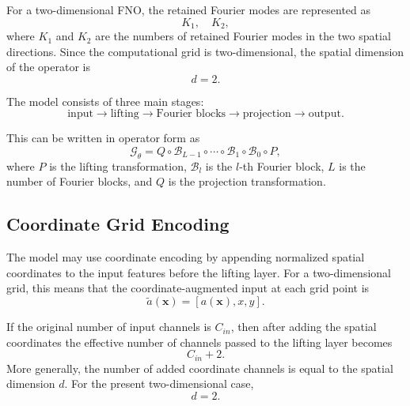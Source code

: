 For a two-dimensional FNO, the retained Fourier modes are represented as
\begin{equation}
K_1, \quad K_2,
\end{equation}
where \(K_1\) and \(K_2\) are the numbers of retained Fourier modes in the two spatial directions. Since the computational grid is two-dimensional, the spatial dimension of the operator is
\begin{equation}
d = 2.
\end{equation}

The model consists of three main stages:
\begin{equation}
\text{input}
\rightarrow
\text{lifting}
\rightarrow
\text{Fourier blocks}
\rightarrow
\text{projection}
\rightarrow
\text{output}.
\end{equation}

This can be written in operator form as
\begin{equation}
\mathcal{G}_{\theta}
=
Q
\circ
\mathcal{B}_{L-1}
\circ
\cdots
\circ
\mathcal{B}_{1}
\circ
\mathcal{B}_{0}
\circ
P,
\end{equation}
where \(P\) is the lifting transformation, \(\mathcal{B}_l\) is the \(l\)-th Fourier block, \(L\) is the number of Fourier blocks, and \(Q\) is the projection transformation.

\subsection{Coordinate Grid Encoding}

The model may use coordinate encoding by appending normalized spatial coordinates to the input features before the lifting layer. For a two-dimensional grid, this means that the coordinate-augmented input at each grid point is
\begin{equation}
\tilde{a}(\boldsymbol{x})
=
\left[
a(\boldsymbol{x}),
x,
y
\right].
\end{equation}

If the original number of input channels is \(C_{in}\), then after adding the spatial coordinates the effective number of channels passed to the lifting layer becomes
\begin{equation}
C_{in} + 2.
\end{equation}
More generally, the number of added coordinate channels is equal to the spatial dimension \(d\). For the present two-dimensional case,
\begin{equation}
d=2.
\end{equation}

